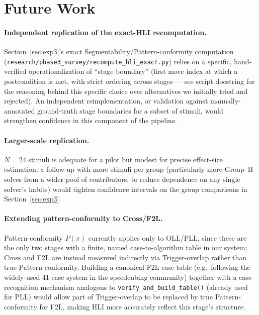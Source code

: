 \documentclass[10pt,conference]{article}
\begin{document}
\section{Future Work}
\label{sec:future}

\paragraph{Independent replication of the exact-HLI recomputation.}
Section~\ref{sec:exp3}'s exact Segmentability/Pattern-conformity
computation (\texttt{research/phase3\_survey/recompute\_hli\_exact.py})
relies on a specific, hand-verified operationalization of ``stage
boundary'' (first move index at which a postcondition is met, with
strict ordering across stages --- see script docstring for the
reasoning behind this specific choice over alternatives we
initially tried and rejected). An independent reimplementation, or
validation against manually-annotated ground-truth stage boundaries
for a subset of stimuli, would strengthen confidence in this
component of the pipeline.

\paragraph{Larger-scale replication.} $N=24$ stimuli is adequate for
a pilot but modest for precise effect-size estimation; a
follow-up with more stimuli per group (particularly more Group~H
solves from a wider pool of contributors, to reduce dependence on
any single solver's habits) would tighten confidence intervals on
the group comparisons in Section~\ref{sec:exp3}.

\paragraph{Extending pattern-conformity to Cross/F2L.}
Pattern-conformity $P(\pi)$ currently applies only to OLL/PLL, since
these are the only two stages with a finite, named case-to-algorithm
table in our system; Cross and F2L are instead measured indirectly via
Trigger-overlap rather than true Pattern-conformity. Building a
canonical F2L case table (e.g.\ following the widely-used 41-case
system in the speedcubing community) together with a case-recognition
mechanism analogous to \texttt{verify\_and\_build\_table()} (already
used for PLL) would allow part of Trigger-overlap to be replaced by
true Pattern-conformity for F2L, making HLI more accurately reflect
this stage's structure.
\end{document}
